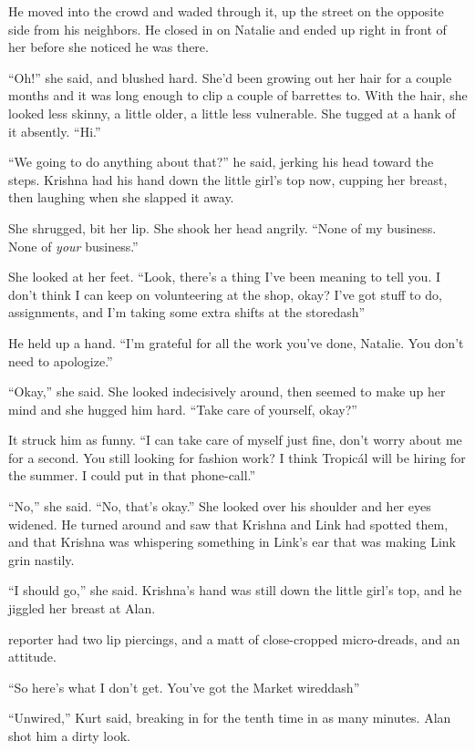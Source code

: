 He moved into the crowd and waded through it, up the street on the
opposite side from his neighbors.  He closed in on Natalie and ended
up right in front of her before she noticed he was there.

``Oh!'' she said, and blushed hard.  She'd been growing out her hair
for a couple months and it was long enough to clip a couple of
barrettes to.  With the hair, she looked less skinny, a little older,
a little less vulnerable.  She tugged at a hank of it absently. 
``Hi.''

``We going to do anything about that?'' he said, jerking his head
toward the steps.  Krishna had his hand down the little girl's top
now, cupping her breast, then laughing when she slapped it away.

She shrugged, bit her lip.  She shook her head angrily.  ``None of my
business.  None of \textit{your} business.''

She looked at her feet.  ``Look, there's a thing I've been meaning to
tell you.  I don't think I can keep on volunteering at the shop, okay? 
I've got stuff to do, assignments, and I'm taking some extra shifts at
the storedash{}''

He held up a hand.  ``I'm grateful for all the work you've done,
Natalie.  You don't need to apologize.''

``Okay,'' she said.  She looked indecisively around, then seemed to
make up her mind and she hugged him hard.  ``Take care of yourself,
okay?''

It struck him as funny.  ``I can take care of myself just fine, don't
worry about me for a second.  You still looking for fashion work?  I
think Tropic\'{a}l will be hiring for the summer.  I could put in that
phone-call.''

``No,'' she said.  ``No, that's okay.'' She looked over his shoulder
and her eyes widened.  He turned around and saw that Krishna and Link
had spotted them, and that Krishna was whispering something in Link's
ear that was making Link grin nastily.

``I should go,'' she said.  Krishna's hand was still down the little
girl's top, and he jiggled her breast at Alan.

 reporter had two lip piercings, and a matt of close-cropped
micro-dreads, and an attitude.

``So here's what I don't get.  You've got the Market wireddash{}''

``Unwired,'' Kurt said, breaking in for the tenth time in as many
minutes.  Alan shot him a dirty look.

